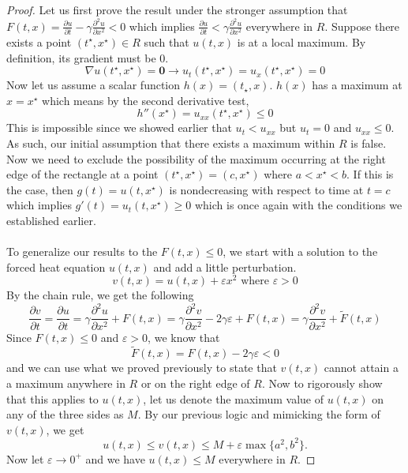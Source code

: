 \documentclass{article}
\newcommand{\pd}[2]{\frac{\partial #1}{\partial #2}}
\newcommand{\pdt}[2]{\frac{\partial ^2 #1}{\partial #2 ^2}}
\newcommand{\vb}[1]{\mathbf{ #1}}
\numberwithin{equation}{section}
\begin{document}
\begin{proof}
    Let us first prove the result under the stronger assumption that $F(t,x) = \pd{u}{t} -\gamma \pdt{u}{x} <0$ which implies $\pd{u}{t} < \gamma \pdt{u}{x}$ everywhere in $R$. Suppose there exists a point $(t^\star, x^\star) \in R$ such that $u(t,x)$ is at a local maximum. By definition, its gradient must be 0.
    \begin{equation*}
        \nabla u(t^\star, x^\star ) = \vb{0} \rightarrow u_t(t^\star,x^\star) = u_{x}(t^\star, x^\star) = 0
    \end{equation*}
    Now let us assume a scalar function $h(x) = (t_\star, x)$. $h(x)$ has a maximum at $x=x^\star$ which means by the second derivative test,
    \begin{equation*}
        h''(x^\star) = u_{xx}(t^\star, x^\star) \leq 0
    \end{equation*}
    This is impossible since we showed earlier that $u_t < u_{xx}$ but $u_t = 0$ and $u_{xx} \leq 0$. As such, our initial assumption that there exists a maximum within $R$ is false. Now we need to exclude the possibility of the maximum occurring at the right edge of the rectangle at a point $(t^\star,x^\star) = (c,x^\star)$ where $a<x^\star < b$. If this is the case, then $g(t) =u(t,x^\star)$ is nondecreasing with respect to time at $t=c$ which implies $g'(t) = u_t(t,x^\star) \geq 0$ which is once again with the conditions we established earlier. \\\\
    To generalize our results to the $F(t,x) \leq 0$, we start with a solution to the forced heat equation $u(t,x)$ and add a little perturbation.
    \begin{equation*}
        v(t,x) = u(t,x) + \varepsilon x^2 \text{ where } \varepsilon>0
    \end{equation*}
    By the chain rule, we get the following 
    \begin{equation*}
        \pd{v}{t} = \pd{u}{t} =\gamma \pdt{u}{x}+F(t,x) = \gamma \pdt{v}{x} -2\gamma \varepsilon+F(t,x) = \gamma \pdt{v}{x} +\tilde{F}(t,x)
    \end{equation*}
    Since $F(t,x) \leq 0$ and $\varepsilon>0$, we know that 
    \begin{equation*}
        \tilde{F}(t,x) = F(t,x) -2\gamma\varepsilon <0
    \end{equation*}
    and we can use what we proved previously to state that $v(t,x)$ cannot attain a a maximum anywhere in $R$ or on the right edge of $R$. Now to rigorously show that this applies to $u(t,x)$, let us denote the maximum value of $u(t,x)$ on any of the three sides as $M$. By our previous logic and mimicking the form of $v(t,x)$, we get
    \begin{equation*}
    u(t,x) \leq v(t,x) \leq M+\varepsilon \max \{a^2,b^2 \}.
    \end{equation*}
    Now let $\varepsilon\rightarrow 0^+$ and we have $u(t,x) \leq M$ everywhere in $R$.
    
\end{proof}
\end{document}
